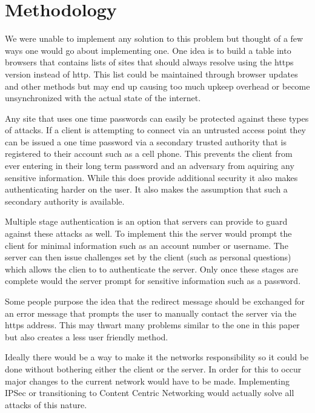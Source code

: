 \documentclass{article}
\begin{document}
\section{Methodology}
We were unable to implement any solution to this problem but thought of a few ways one would go about implementing one.
One idea is to build a table into browsers that contains lists of sites that should always resolve using the https version instead of http.  This list could be maintained through browser updates and other methods but may end up causing too much upkeep overhead or become unsynchronized with the actual state of the internet.

Any site that uses one time passwords can easily be protected against these types of attacks.  If a client is attempting to connect via an untrusted access point they can be issued a one time password via a secondary trusted authority that is registered to their account such as a cell phone.  This prevents the client from ever entering in their long term password and an adversary from aquiring any sensitive information.  While this does provide additional security it also makes authenticating harder on the user.  It also makes the assumption that such a secondary authority is available.

Multiple stage authentication is an option that servers can provide to guard against these attacks as well.  To implement this the server would prompt the client for minimal information such as an account number or username.  The server can then issue challenges set by the client (such as personal questions) which allows the clien to to authenticate the server.  Only once these stages are complete would the server prompt for sensitive information such as a password.

Some people purpose the idea that the redirect message should be exchanged for an error message that prompts the user to manually contact the server via the https address.  This may thwart many problems similar to the one in this paper but also creates a less user friendly method.

Ideally there would be a way to make it the networks responsibility so it could be done without bothering either the client or the server.  In order for this to occur major changes to the current network would have to be made.  Implementing IPSec or transitioning to Content Centric Networking would actually solve all attacks of this nature.
\end{document}
